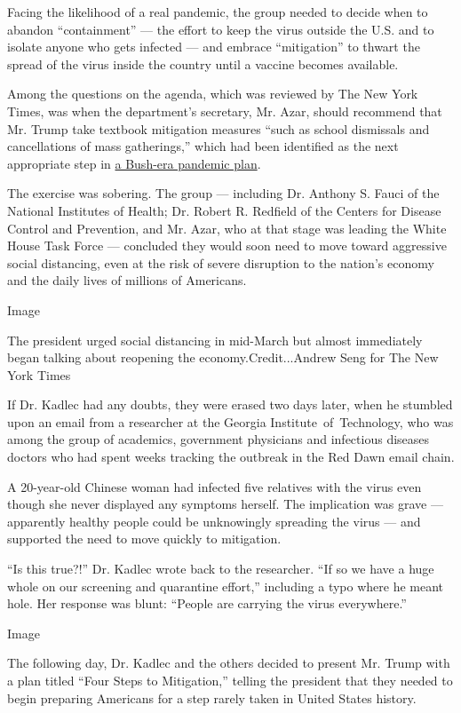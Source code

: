 Facing the likelihood of a real pandemic, the group needed to decide
when to abandon ``containment'' --- the effort to keep the virus outside
the U.S. and to isolate anyone who gets infected --- and embrace
``mitigation'' to thwart the spread of the virus inside the country
until a vaccine becomes available.

Among the questions on the agenda, which was reviewed by The New York
Times, was when the department's secretary, Mr. Azar, should recommend
that Mr. Trump take textbook mitigation measures ``such as school
dismissals and cancellations of mass gatherings,'' which had been
identified as the next appropriate step in
\href{https://www.cdc.gov/flu/pandemic-resources/pdf/community_mitigation-sm.pdf}{a
Bush-era pandemic plan}.

The exercise was sobering. The group --- including Dr. Anthony S. Fauci
of the National Institutes of Health; Dr. Robert R. Redfield of the
Centers for Disease Control and Prevention, and Mr. Azar, who at that
stage was leading the White House Task Force --- concluded they would
soon need to move toward aggressive social distancing, even at the risk
of severe disruption to the nation's economy and the daily lives of
millions of Americans.

Image

The president urged social distancing in mid-March but almost
immediately began talking about reopening the economy.Credit...Andrew
Seng for The New York Times

If Dr. Kadlec had any doubts, they were erased two days later, when he
stumbled upon an email from a researcher at the Georgia
Institute~of~Technology, who was among the group of academics,
government physicians and infectious diseases doctors who had spent
weeks tracking the outbreak in the Red Dawn email chain.

A 20-year-old Chinese woman had infected five relatives with the virus
even though she never displayed any symptoms herself. The implication
was grave --- apparently healthy people could be unknowingly spreading
the virus --- and supported the need to move quickly to mitigation.

``Is this true?!'' Dr. Kadlec wrote back to the researcher. ``If so we
have a huge whole on our screening and quarantine effort,'' including a
typo where he meant hole. Her response was blunt: ``People are carrying
the virus everywhere.''

Image

The following day, Dr. Kadlec and the others decided to present Mr.
Trump with a plan titled ``Four Steps to Mitigation,'' telling the
president that they needed to begin preparing Americans for a step
rarely taken in United States history.

